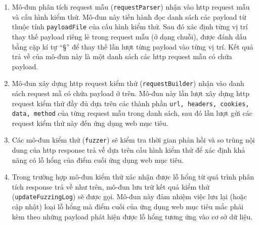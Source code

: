 \begin{enumerate}
    \item Mô-đun phân tích request mẫu (\texttt{requestParser}) nhận vào \acrshort{http} request mẫu và cấu hình kiểm thử. Mô-đun này tiến hành đọc danh sách các payload từ thuộc tính \texttt{payloadFile} của cấu hình kiểm thử. Sau đó xác định từng vị trí thay thế payload riêng lẻ trong request mẫu (ở dạng chuỗi), được đánh dấu bằng cặp kí tự ``\S'' để thay thế lần lượt từng payload vào từng vị trí. Kết quả trả về của mô-đun này là một danh sách các \acrshort{http} request mẫu có chứa payload.
    \item Mô-đun xây dựng \acrshort{http} request kiểm thử (\texttt{requestBuilder}) nhận vào danh sách request mẫ có chứa payload ở trên. Mô-đun này lần lượt xây dựng \acrshort{http} request kiểm thử đầy đủ dựa trên các thành phần \texttt{url, headers, cookies, data, method} của từng request mẫu trong danh sách, sau đó lần lượt gửi các request kiểm thử này đến ứng dụng web mục tiêu.
    \item Các mô-đun kiểm thử (\texttt{fuzzer}) sẽ kiểm tra thời gian phản hồi và so trùng nội dung của \acrshort{http} response trả về dựa trên cấu hình kiểm thử để xác định khả năng có lỗ hổng của điểm cuối ứng dụng web mục tiêu. 
    \item Trong trường hợp mô-đun kiểm thử xác nhận được lỗ hổng từ quá trình phân tích response trả về như trên, mô-đun lưu trữ kết quả kiểm thử (\texttt{updateFuzzingLog}) sẽ được gọi. Mô-đun này đảm nhiệm việc lưu lại (hoặc cập nhật) loại lỗ hổng mà điểm cuối của ứng dụng web mục tiêu mắc phải kèm theo những payload phát hiện được lỗ hổng tương ứng vào cơ sở dữ liệu.
\end{enumerate}
